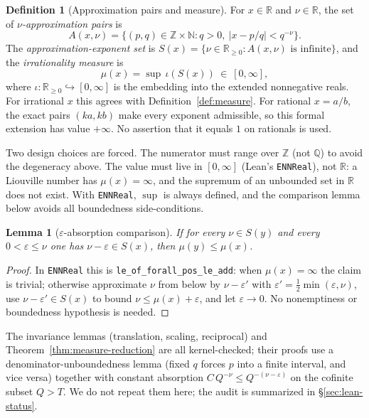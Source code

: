 \documentclass[11pt]{amsart}
\newtheorem{lemma}[theorem]{Lemma}
\theoremstyle{definition}
\newtheorem{definition}[theorem]{Definition}
\theoremstyle{remark}
\numberwithin{equation}{section}
\newcommand{\Q}{\mathbb{Q}}
\newcommand{\R}{\mathbb{R}}
\newcommand{\Z}{\mathbb{Z}}
\newcommand{\N}{\mathbb{N}}
\newcommand{\irr}{\mu}
\begin{document}
\begin{definition}[Approximation pairs and measure]\label{def:lean-measure}
For $x\in\R$ and $\nu\in\R$, the set of \emph{$\nu$-approximation pairs} is
\[
A(x,\nu)=\{(p,q)\in\Z\times\N: q>0,\ |x-p/q|<q^{-\nu}\}.
\]
The \emph{approximation-exponent set} is $S(x)=\{\nu\in\R_{\ge0}: A(x,\nu)\text{ is infinite}\}$, and the \emph{irrationality measure} is
\[
\irr(x)=\sup\,\iota(S(x))\ \in\ [0,\infty],
\]
where $\iota:\R_{\ge0}\hookrightarrow[0,\infty]$ is the embedding into the extended nonnegative reals. For irrational $x$ this agrees with Definition~\ref{def:measure}. For rational $x=a/b$, the exact pairs $(ka,kb)$ make every exponent admissible, so this formal extension has value $+\infty$. No assertion that it equals $1$ on rationals is used.
\end{definition}

Two design choices are forced. The numerator must range over $\Z$ (not $\Q$) to avoid the degeneracy above. The value must live in $[0,\infty]$ (Lean's \texttt{ENNReal}), not $\R$: a Liouville number has $\irr(x)=\infty$, and the supremum of an unbounded set in $\R$ does not exist. With \texttt{ENNReal}, $\sup$ is always defined, and the comparison lemma below avoids all boundedness side-conditions.

\begin{lemma}[$\varepsilon$-absorption comparison]\label{lem:eps-abs}
If for every $\nu\in S(y)$ and every $0<\varepsilon\le\nu$ one has $\nu-\varepsilon\in S(x)$, then $\irr(y)\le\irr(x)$.
\end{lemma}
\begin{proof}
In \texttt{ENNReal} this is \texttt{le\_\allowbreak{}of\_\allowbreak{}forall\_\allowbreak{}pos\_\allowbreak{}le\_\allowbreak{}add}: when $\irr(x)=\infty$ the claim is trivial; otherwise approximate $\nu$ from below by $\nu-\varepsilon'$ with $\varepsilon'=\tfrac12\min(\varepsilon,\nu)$, use $\nu-\varepsilon'\in S(x)$ to bound $\nu\le\irr(x)+\varepsilon$, and let $\varepsilon\to0$. No nonemptiness or boundedness hypothesis is needed.
\end{proof}

The invariance lemmas (translation, scaling, reciprocal) and Theorem~\ref{thm:measure-reduction} are all kernel-checked; their proofs use a denominator-unboundedness lemma (fixed $q$ forces $p$ into a finite interval, and vice versa) together with constant absorption $C\,Q^{-\nu}\le Q^{-(\nu-\varepsilon)}$ on the cofinite subset $Q>T$. We do not repeat them here; the audit is summarized in \S\ref{sec:lean-status}.
\end{document}
